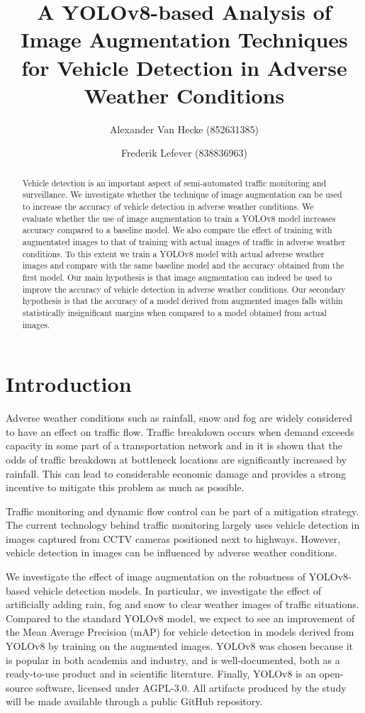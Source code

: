 \documentclass[]{article}
\title{A YOLOv8-based Analysis of Image Augmentation Techniques for Vehicle Detection in Adverse Weather Conditions}
\author{
		Alexander Van Hecke \small(852631385) \and 
		Frederik Lefever    \small(838836963)}
\begin{document}
\maketitle

\begin{abstract}
	Vehicle detection is an important aspect of semi-automated traffic monitoring and surveillance.  We investigate whether the technique of image augmentation can be used to increase the accuracy of vehicle detection in adverse weather conditions.  We evaluate whether the use of image augmentation to train a YOLO\small{v8} model increases accuracy compared to a baseline model.  We also compare the effect of training with augmentated images to that of training with actual images of traffic in adverse weather conditions. To this extent we train a YOLO\small{v8} model with actual adverse weather images and compare with the same baseline model and the accuracy obtained from the first model. Our main hypothesis is that image augmentation can indeed be used to improve the accuracy of vehicle detection in adverse weather conditions. Our secondary hypothesis is that the accuracy of a model derived from augmented images falls within statistically insignificant margins when compared to a model obtained from actual images.
\end{abstract}

\section{Introduction}

	Adverse weather conditions such as rainfall, snow and fog are widely considered to have an effect on traffic flow. Traffic breakdown occurs when demand exceeds capacity in some part of a transportation network and in \cite{stralenInfluenceAdverseWeather2015} it is shown that the odds of traffic breakdown at bottleneck locations are significantly increased by rainfall.  This can lead to considerable economic damage and provides a strong incentive to mitigate this problem as much as possible.
	
	Traffic monitoring and dynamic flow control can be part of a mitigation strategy. The current technology behind traffic monitoring largely uses vehicle detection in images captured from CCTV cameras positioned next to highways. However, vehicle detection in images can be influenced by adverse weather conditions.
	
	We investigate the effect of image augmentation on the robustness of YOLO{\small v8}-based vehicle detection models. In particular, we investigate the effect of artificially adding rain, fog and snow to clear weather images of traffic situations. Compared to the standard YOLO{\small v8} model, we expect to see an improvement of the Mean Average Precision (mAP) for vehicle detection in models derived from YOLO{\small v8} by training on the augmented images. YOLO{\small v8} was chosen because it is popular in both academia and industry, and is well-documented, both as a ready-to-use product and in scientific literature. Finally, YOLO{\small v8} is an open-source software, licensed under AGPL-3.0.  All artifacts produced by the study will be made available through a public GitHub repository.
\end{document}
